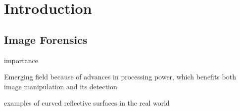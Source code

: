 \section{Introduction}

\subsection{Image Forensics}
importance

Emerging field because of advances in processing power, which benefits both image manipulation and its detection

examples of curved reflective surfaces in the real world